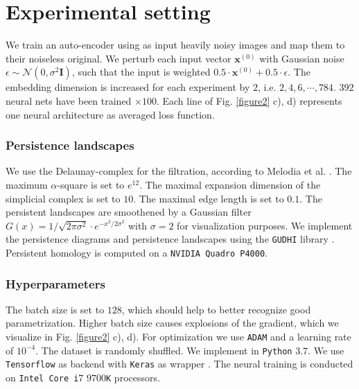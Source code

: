 \documentclass[runningheads,orivec]{llncs}
\begin{document}
\section{Experimental setting}
We train an auto-encoder using as input heavily noisy images and map them to their noiseless original. We perturb each input vector $\textbf{x}^{(0)}$ with Gaussian noise $\epsilon \sim \mathcal{N}(0,\sigma^2 \mathbf{I})$, such that the input is weighted $0.5 \cdot \textbf{x}^{(0)} + 0.5 \cdot \epsilon$. The embedding dimension is increased for each experiment by $2$, i.e. $2,4,6, \cdots, 784$. $392$ neural nets have been trained $\times 100$. Each line of Fig. \ref{figure2} c), d) represents one neural architecture as averaged loss function.

\subsubsection*{Persistence landscapes} We use the Delaunay-complex for the filtration, according to Melodia et al. \cite{lume}. The maximum $\alpha$-square is set to $e^{12}$. The maximal expansion dimension of the simplicial complex is set to $10$. The maximal edge length is set to $0.1$. The persistent landscapes are smoothened by a Gaussian filter $G(x) = 1 / \sqrt{2 \pi \sigma^2} \cdot e^{- x^2 / 2 \sigma^2}$ with $\sigma = 2$ for visualization purposes. We implement the persistence diagrams and persistence landscapes using the \texttt{GUDHI} library \cite{gudhi:urm}. Persistent homology is computed on a \texttt{NVIDIA Quadro P4000}.
\subsubsection*{Hyperparameters} The batch size is set to $128$, which should help to better recognize good parametrization. Higher batch size causes explosions of the gradient, which we visualize in Fig. \ref{figure2} c), d). For optimization we use \texttt{ADAM} \cite{KingmaB14} and a learning rate of $10^{-4}$. The dataset is randomly shuffled. We implement in \texttt{Python} $3.7$. We use \texttt{Tensorflow} as backend \cite{tensorflow2015-whitepaper} with \texttt{Keras} as wrapper \cite{chollet2015keras}. The neural training is conducted on \texttt{Intel Core i}$7$ $9700$\texttt{K} processors.

\end{document}
